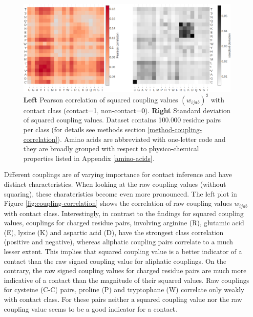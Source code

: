 \documentclass[12pt,a4paper,twoside]{book}
\newcommand{\wijab}{w_{ijab}}
\theoremstyle{definition}
\theoremstyle{definition}
\theoremstyle{remark}
\begin{document}
\begin{figure}

{\centering \includegraphics[width=1\linewidth]{img/coupling_matrix_analysis/combi_squared_couplings_correlation_and_stddev_heatmap_notitle} 

}

\caption{\textbf{Left} Pearson correlation of squared
coupling values \((\wijab)^2\) with contact class (contact=1,
non-contact=0). \textbf{Right} Standard deviation of squared coupling
values. Dataset contains 100.000 residue pairs per class (for details
see methods section \ref{method-coupling-correlation}). Amino acids are
abbreviated with one-letter code and they are broadly grouped with
respect to physico-chemical properties listed in Appendix
\ref{amino-acids}.}\label{fig:sq-coupling-correlation}
\end{figure}

Different couplings are of varying importance for contact inference and
have distinct characteristics. When looking at the raw coupling values
(without squaring), these charateristics become even more pronounced.
The left plot in Figure \ref{fig:coupling-correlation} shows the
correlation of raw coupling values \(\wijab\) with contact class.
Interestingly, in contrast to the findings for squared coupling values,
couplings for charged residue pairs, involving arginine (R), glutamic
acid (E), lysine (K) and aspartic acid (D), have the strongest class
correlation (positive and negative), whereas aliphatic coupling pairs
correlate to a much lesser extent. This implies that squared coupling
value is a better indicator of a contact than the raw signed coupling
value for aliphatic couplings. On the contrary, the raw signed coupling
values for charged residue pairs are much more indicative of a contact
than the magnitude of their squared values. Raw couplings for cysteine
(C-C) pairs, proline (P) and tryptophane (W) correlate only weakly with
contact class. For these pairs neither a squared coupling value nor the
raw coupling value seems to be a good indicator for a contact.
\end{document}
